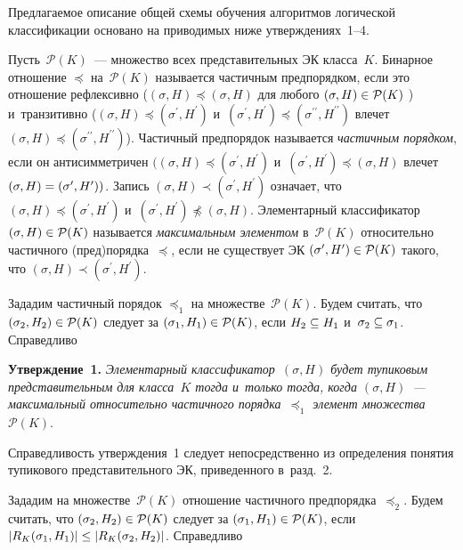 \begin{multicols}{2}
  Предлагаемое описание общей схемы обуче\-ния алгоритмов логической 
классификации основано на приводимых ниже утверж\-де\-ни\-ях~1--4. 
  
  Пусть~$\mathcal{P}(K)$~--- множество всех пред\-ста\-ви\-тель\-ных ЭК 
класса~$K$. Бинарное отношение $\preceq$ на~$\mathcal{P}(K)$ называется 
час\-тич\-ным предпорядком, если это отношение реф\-лек\-сив\-но ($(\sigma, H) 
\preceq (\sigma, H)$ для любого $(\sigma, H)\hm\in \mathcal{P}(K)$ ) 
и~транзитивно ($(\sigma, H)\preceq (\sigma^\prime, H^\prime)$ и~$(\sigma^\prime, 
H^\prime) \preceq (\sigma^{\prime\prime}, H^{\prime\prime})$  влечет $(\sigma, 
H)\preceq (\sigma^{\prime\prime}, H^{\prime\prime})$). Час\-тич\-ный предпорядок 
называется \textit{частичным порядком}, если он ан\-ти\-сим\-мет\-ри\-чен $((\sigma, 
H)\preceq (\sigma^\prime, H^\prime)$ и~$(\sigma^\prime, H^\prime) \preceq 
(\sigma, H)$ влечет $(\sigma, H)\hm= (\sigma^\prime, H^\prime))$. Запись 
$(\sigma, H) \prec (\sigma^\prime, H^\prime)$ озна\-ча\-ет, что $(\sigma, H) \preceq 
(\sigma^\prime, H^\prime)$ и~$(\sigma^\prime, H^\prime)\not\preceq (\sigma, H)$.
Элементарный 
классификатор $(\sigma, H) \hm\in \mathcal{P}(K)$ называется \textit{максимальным 
элементом} в~$\mathcal{P}(K)$ относительно час\-тич\-но\-го 
(пред)порядка~$\preceq$, если не существует ЭК $(\sigma^\prime, H^\prime) 
\hm\in \mathcal{P}(K)$ такого, что $(\sigma, H) \prec (\sigma^\prime, H^\prime)$.
  
  Зададим частичный порядок $\preceq_1$ на множестве~$\mathcal{P}(K)$. 
Будем считать, что $(\sigma_2, H_2)\hm\in \mathcal{P}(K)$ следует за $(\sigma_1, 
H_1) \hm\in \mathcal{P}(K)$, если $H_2\hm\subseteq H_1$ 
и~$\sigma_2\hm\subseteq \sigma_1$. Спра\-вед\-ливо
  
  \smallskip
  
  \noindent
  \textbf{Утверждение~1.} \textit{Элементарный 
классификатор~$(\sigma, H)$ будет тупиковым 
пред\-ста\-ви\-тель\-ным для класса~$K$ тогда и~только тогда, когда  
$(\sigma, H)$~--- максимальный относительно час\-тич\-но\-го 
порядка~$\preceq_1$ элемент множества~$\mathcal{P}(K)$}.
  
  \smallskip
  
  Справедливость утверж\-де\-ния~1 следует непосредственно из определения 
понятия тупикового пред\-ста\-ви\-тель\-но\-го ЭК, приведенного в~разд.~2.
  
  Зададим на множестве~$\mathcal{P}(K)$ отношение час\-тич\-но\-го предпорядка~$\preceq_2$. 
  Будем считать, что $(\sigma_2, H_2)\hm\in \mathcal{P}(K)$ следует 
за $(\sigma_1, H_1)\hm\in \mathcal{P}(K)$, если $\vert R_K(\sigma_1, H_1)\vert 
\hm\leq \vert R_K(\sigma_2, H_2)\vert$. Спра\-вед\-ливо
  

\end{multicols}
